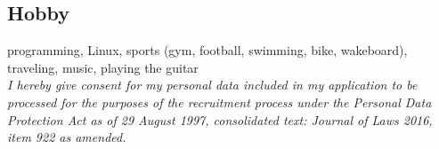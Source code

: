 \documentclass{article}
\begin{document}
    \subsection*{Hobby}
    programming, Linux, sports (gym, football, swimming, bike, wakeboard), traveling, music, playing the guitar\\

    \textit{
    I hereby give consent for my personal data included in my application
    to be processed for the purposes of the recruitment process
    under the Personal Data Protection Act as of 29 August 1997,
    consolidated text: Journal of Laws 2016, item 922 as amended.
    }
\end{document}
